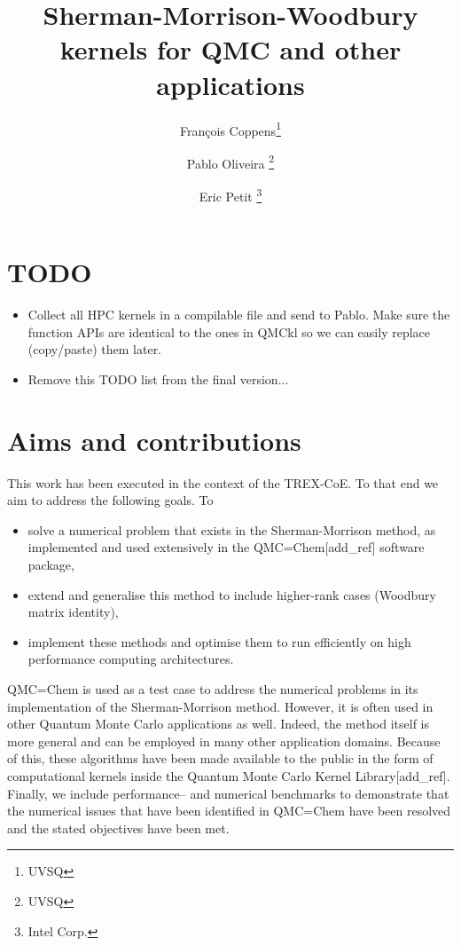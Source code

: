 \documentclass[11pt]{article}
\title{Sherman-Morrison-Woodbury kernels for QMC and other applications}
\author{Fran\c{c}ois Coppens\thanks{UVSQ} \and Pablo Oliveira \thanks{UVSQ} \and Eric Petit \thanks{Intel Corp.}}
\numberwithin{figure}{section}
\numberwithin{table}{section}
\begin{document}
	\maketitle
	\tableofcontents
	
  \section*{TODO}
    \begin{itemize}           
      \item Collect all HPC kernels in a compilable file and send to Pablo. Make sure the function APIs are identical to the ones in QMCkl so we can easily replace (copy/paste) them later.
      \item Remove this TODO list from the final version...
    \end{itemize}
    
  \newpage
  \section{Aims and contributions}      
    This work has been executed in the context of the TREX-CoE\cite{trex-coe}. To that end we aim to address the following goals. To
    \begin{itemize}
      \item solve a numerical problem that exists in the Sherman-Morrison method, as implemented and used extensively in the QMC=Chem[add\_ref] software package,
      \item extend and generalise this method to include higher-rank cases (Woodbury matrix identity),
      \item implement these methods and optimise them to run efficiently on high performance computing architectures.
    \end{itemize}
      
      QMC=Chem is used as a test case to address the numerical problems in its implementation of the Sherman-Morrison method. However, it is often used in other Quantum Monte Carlo applications as well. Indeed, the method itself is more general and can be employed in many other application domains. Because of this, these algorithms have been made available to the public in the form of computational kernels inside the Quantum Monte Carlo Kernel Library[add\_ref].\\
      
      Finally, we include performance-- and numerical benchmarks to demonstrate that the numerical issues that have been identified in QMC=Chem have been resolved and the stated objectives have been met.
\end{document}
